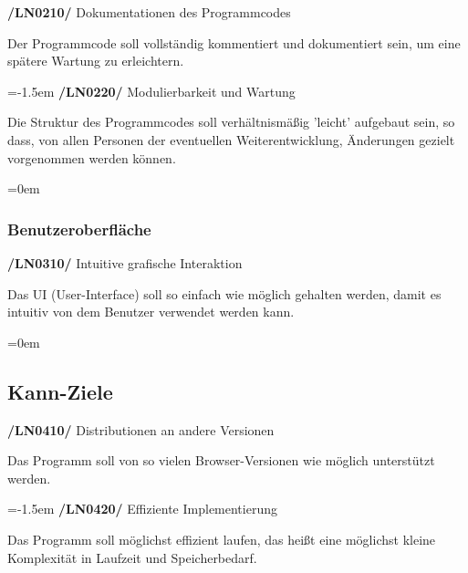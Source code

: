\documentclass[11pt,a4paper]{report}
\begin{document}
\textbf{/LN0210/} Dokumentationen des Programmcodes
\par
\begingroup
\leftskip=1cm
\noindent Der Programmcode soll vollständig kommentiert und dokumentiert sein, um eine spätere Wartung zu erleichtern.\\
\par
\endgroup

\leftskip=-1.5em
\textbf{/LN0220/} Modulierbarkeit und Wartung
\par
\begingroup
\leftskip=1cm
\noindent Die Struktur des Programmcodes soll verhältnismäßig 'leicht' aufgebaut sein, so dass, von allen Personen der eventuellen Weiterentwicklung, Änderungen gezielt vorgenommen werden können.\\
\par
\endgroup

\leftskip=0em
\subsubsection{Benutzeroberfläche}

\textbf{/LN0310/} Intuitive grafische Interaktion
\par
\begingroup
\leftskip=1cm
\noindent Das UI (User-Interface) soll so einfach wie möglich gehalten werden, damit es intuitiv von dem Benutzer verwendet werden kann.\\
\par
\endgroup

\leftskip=0em
\subsection{Kann-Ziele}
\textbf{/LN0410/} Distributionen an andere Versionen
\par
\begingroup
\leftskip=1cm
\noindent Das Programm soll von so vielen Browser-Versionen wie möglich unterstützt werden.\\
\par
\endgroup

\leftskip=-1.5em
\textbf{/LN0420/} Effiziente Implementierung
\par
\begingroup
\leftskip=1cm
\noindent Das Programm soll möglichst effizient laufen, das heißt eine möglichst kleine Komplexität in Laufzeit und Speicherbedarf.\\
\par
\endgroup

\newpage
\end{document}
